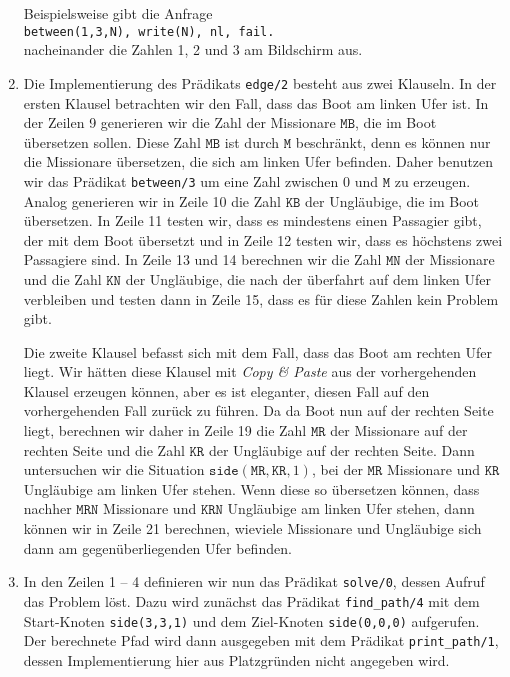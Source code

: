 \begin{enumerate}
      Beispielsweise gibt die Anfrage \\[0.1cm]
      \hspace*{1.3cm} \texttt{between(1,3,N), write(N), nl, fail.}  \\[0.1cm]
      nacheinander die Zahlen 1, 2 und 3 am Bildschirm aus.
    \item Die Implementierung des Pr\"{a}dikats \texttt{edge/2} besteht aus zwei Klauseln.  In
      der ersten Klausel betrachten wir den Fall, dass das Boot am linken Ufer ist.  In
      der Zeilen 9 generieren wir die Zahl der Missionare $\texttt{MB}$, die im Boot \"{u}bersetzen
      sollen.  Diese Zahl $\texttt{MB}$ ist durch $\texttt{M}$ beschr\"{a}nkt, denn es k\"{o}nnen nur die Missionare
      \"{u}bersetzen, die sich am linken Ufer befinden.  Daher benutzen wir das Pr\"{a}dikat
      \texttt{between/3} um eine Zahl zwischen 0 und $\texttt{M}$ zu erzeugen.  Analog generieren
      wir in Zeile 10 die Zahl $\texttt{KB}$ der Ungl\"{a}ubige, die im Boot \"{u}bersetzen.  In Zeile 11
      testen wir, dass es mindestens einen Passagier gibt, der mit dem Boot \"{u}bersetzt und
      in Zeile 12 testen wir, dass es h\"{o}chstens zwei Passagiere sind.  In Zeile 13 und 14
      berechnen wir die Zahl $\texttt{MN}$ der Missionare und die Zahl $\texttt{KN}$ der Ungl\"{a}ubige, die
      nach der \"{u}berfahrt auf dem linken Ufer verbleiben und testen dann in Zeile 15, dass es
      f\"{u}r diese Zahlen kein Problem gibt.
      
      Die zweite Klausel befasst sich mit dem Fall, dass das Boot am rechten Ufer liegt.
      Wir h\"{a}tten diese Klausel mit \textsl{Copy \& Paste} aus der vorhergehenden Klausel
      erzeugen k\"{o}nnen, aber es ist eleganter, diesen Fall auf den vorhergehenden Fall
      zur\"{u}ck zu f\"{u}hren.  Da da Boot nun auf der rechten Seite liegt, berechnen wir daher
      in Zeile 19 die Zahl $\texttt{MR}$ der Missionare auf der rechten Seite und die Zahl
      $\texttt{KR}$ der Ungl\"{a}ubige auf der rechten Seite.  Dann untersuchen wir die
      Situation $\mathtt{side}(\mathtt{MR}, \mathtt{KR}, 1)$, bei der $\texttt{MR}$
      Missionare und $\texttt{KR}$ Ungl\"{a}ubige am linken Ufer stehen.  Wenn diese so
      \"{u}bersetzen k\"{o}nnen, dass nachher $\texttt{MRN}$ Missionare und $\texttt{KRN}$
      Ungl\"{a}ubige am linken Ufer stehen, dann k\"{o}nnen wir in Zeile 21 berechnen, wieviele
      Missionare und Ungl\"{a}ubige sich dann am gegen\"{u}berliegenden Ufer befinden.
\item In den Zeilen 1 -- 4 definieren wir nun das Pr\"{a}dikat \texttt{solve/0}, dessen Aufruf
      das Problem l\"{o}st.  Dazu wird zun\"{a}chst das Pr\"{a}dikat \texttt{find\_path/4} 
      mit dem Start-Knoten \texttt{side(3,3,1)} und dem Ziel-Knoten \texttt{side(0,0,0)}
      aufgerufen.   Der berechnete Pfad wird dann ausgegeben mit dem Pr\"{a}dikat
      \texttt{print\_path/1},
      dessen Implementierung hier aus Platzgr\"{u}nden nicht angegeben wird.
\end{enumerate}


